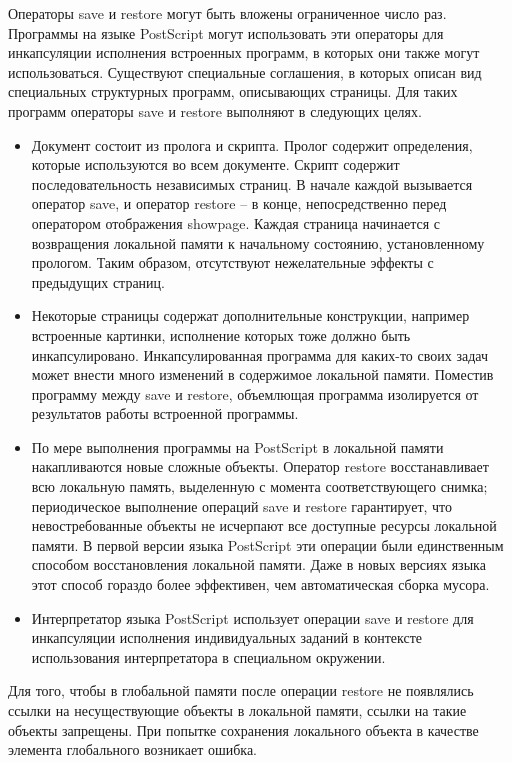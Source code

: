 \documentclass[14pt]{extarticle}
\begin{document}
Операторы save и restore могут быть вложены ограниченное число раз. Программы на языке PostScript могут использовать эти операторы для инкапсуляции исполнения встроенных программ, в которых они также могут использоваться.
Существуют специальные соглашения, в которых описан вид специальных структурных программ, описывающих страницы. Для таких программ операторы save и restore выполняют в следующих целях.
\begin{itemize}
\item Документ состоит из пролога и скрипта. Пролог содержит определения, которые используются во всем документе. Скрипт содержит последовательность независимых страниц. В начале каждой вызывается оператор save, и оператор restore – в конце, непосредственно перед оператором отображения showpage. Каждая страница начинается с возвращения локальной памяти к начальному состоянию, установленному прологом. Таким образом, отсутствуют нежелательные эффекты с предыдущих страниц.
\item Некоторые страницы содержат дополнительные конструкции, например встроенные картинки, исполнение которых тоже должно быть инкапсулировано. Инкапсулированная программа для каких-то своих задач может внести много изменений в содержимое локальной памяти. Поместив программу между save и restore, объемлющая программа  изолируется от результатов работы встроенной программы.
\item По мере выполнения программы на PostScript в локальной памяти накапливаются новые сложные объекты. Оператор restore восстанавливает всю локальную память, выделенную с момента соответствующего снимка; периодическое выполнение операций save и restore гарантирует, что невостребованные объекты не исчерпают все доступные ресурсы локальной памяти. В первой версии языка PostScript эти операции были единственным способом восстановления локальной памяти. Даже в новых версиях языка этот способ гораздо более эффективен, чем автоматическая сборка мусора.
\item Интерпретатор языка PostScript использует операции save и restore для инкапсуляции исполнения индивидуальных заданий в контексте использования интерпретатора в специальном окружении.
\end{itemize}

Для того, чтобы в глобальной памяти после операции restore не появлялись ссылки на несуществующие объекты в локальной памяти, ссылки на такие объекты запрещены. При попытке сохранения локального объекта в качестве элемента глобального возникает ошибка.
\end{document}
